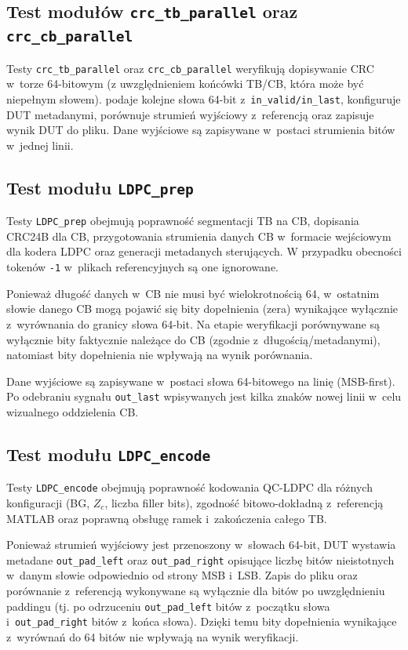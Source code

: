 \subsection{Test modułów \texttt{crc\_tb\_parallel} oraz \texttt{crc\_cb\_parallel}}
\label{subsec:tb_crc_parallel}

Testy \texttt{crc\_tb\_parallel} oraz \texttt{crc\_cb\_parallel} weryfikują dopisywanie CRC w~torze 64-bitowym
(z uwzględnieniem końcówki TB/CB, która może być niepełnym słowem).
 podaje kolejne słowa 64-bit z~\texttt{in\_valid/in\_last}, konfiguruje DUT metadanymi,
porównuje strumień wyjściowy z~referencją oraz zapisuje wynik DUT do pliku.
Dane wyjściowe są zapisywane w~postaci strumienia bitów w~jednej linii.

\subsection{Test modułu \texttt{LDPC\_prep}}
\label{subsec:tb_ldpc_prep}

Testy \texttt{LDPC\_prep} obejmują poprawność segmentacji TB na CB, dopisania CRC24B dla CB,
przygotowania strumienia danych CB w~formacie wejściowym dla kodera LDPC oraz generacji metadanych sterujących.
W przypadku obecności tokenów \texttt{-1} w~plikach referencyjnych są one ignorowane.

Ponieważ długość danych w~CB nie musi być wielokrotnością 64, w~ostatnim słowie danego CB mogą pojawić się
bity dopełnienia (zera) wynikające wyłącznie z~wyrównania do granicy słowa 64-bit.
Na etapie weryfikacji porównywane są wyłącznie bity faktycznie należące do CB (zgodnie z~długością/metadanymi),
natomiast bity dopełnienia nie wpływają na wynik porównania.

Dane wyjściowe są zapisywane w~postaci słowa 64-bitowego na linię (MSB-first). Po odebraniu sygnału
\texttt{out\_last} wpisywanych jest kilka znaków nowej linii w~celu wizualnego oddzielenia CB.

\subsection{Test modułu \texttt{LDPC\_encode}}
\label{subsec:tb_ldpc_encode}

Testy \texttt{LDPC\_encode} obejmują poprawność kodowania QC-LDPC dla różnych konfiguracji (BG, $Z_c$, liczba filler bits),
zgodność bitowo-dokładną z~referencją MATLAB oraz poprawną obsługę ramek i~zakończenia całego TB.

Ponieważ strumień wyjściowy jest przenoszony w~słowach 64-bit, DUT wystawia metadane \texttt{out\_pad\_left} oraz
\texttt{out\_pad\_right} opisujące liczbę bitów nieistotnych w~danym słowie odpowiednio od strony MSB i~LSB.
Zapis do pliku oraz porównanie z~referencją wykonywane są wyłącznie dla bitów po uwzględnieniu paddingu
(tj. po odrzuceniu \texttt{out\_pad\_left} bitów z~początku słowa i~\texttt{out\_pad\_right} bitów z~końca słowa).
Dzięki temu bity dopełnienia wynikające z~wyrównań do 64 bitów nie wpływają na wynik weryfikacji.

